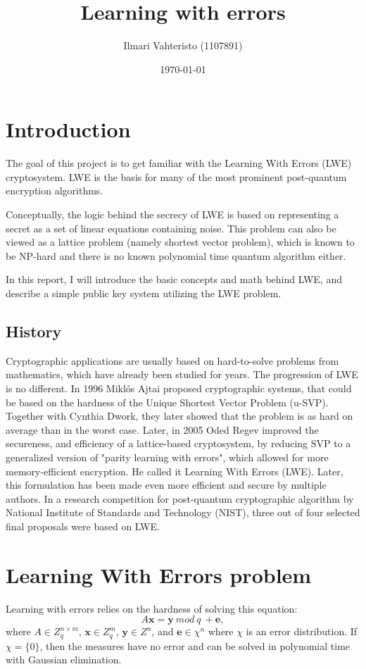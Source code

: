 \documentclass[12pt]{article}
\title{Learning with errors}
\author{Ilmari Vahteristo (1107891)}
\date{\today}
\begin{document}
\maketitle
\singlespacing
\tableofcontents
\newpage
\section{Introduction}
\label{Introduction}
\noindent The goal of this project is to get familiar with the Learning With Errors (LWE) cryptosystem. LWE is the basis for many of the most prominent post-quantum encryption algorithms.

\noindent Conceptually, the logic behind the secrecy of LWE is based on representing a secret as a set of linear equations containing noise. This problem can also be viewed as a lattice problem (namely shortest vector problem), which is known to be NP-hard and there is no known polynomial time quantum algorithm either.

\noindent In this report, I will introduce the basic concepts and math behind LWE, and describe a simple public key system utilizing the LWE problem.

\subsection{History}
\noindent Cryptographic applications are usually based on hard-to-solve problems from mathematics, which have already been studied for years. The progression of LWE is no different.
In 1996 Miklós Ajtai proposed cryptographic systems, that could be based on the hardness of the Unique Shortest Vector Problem (u-SVP). Together with Cynthia Dwork, they later showed that the problem is as hard on average than in the worst case.
\noindent Later, in 2005 Oded Regev improved the secureness, and efficiency of a lattice-based cryptosystem, by reducing SVP to a generalized version of "parity learning with errors", which allowed for more memory-efficient encryption. He called it Learning With Errors (LWE). Later, this formulation has been made even more efficient and secure by multiple authors. In a research competition for post-quantum cryptographic algorithm by National Institute of Standards and Technology (NIST), three out of four selected final proposals were based on LWE.

\section{Learning With Errors problem}
\noindent Learning with errors relies on the hardness of solving this equation:
\begin{equation}
\label{LWE_eq}
    A\boldsymbol{x} = \boldsymbol{y} \: mod\:q \: + \boldsymbol{e},
\end{equation}
where $A \in Z^{n\times m}_q$, $\boldsymbol{x} \in Z^m_q$, $\boldsymbol{y} \in Z^n$, and $\boldsymbol{e} \in \chi^n$ where $\chi$ is an error distribution. If $\chi = \{0\}$, then the measures have no error and can be solved in polynomial time with Gaussian elimination.
\end{document}
